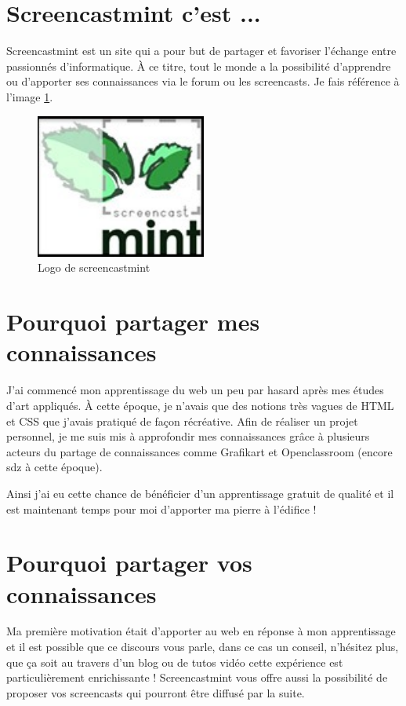 \documentclass[a4paper,11pt]{article}
\begin{document}
\listoffigures


\section{Screencastmint c'est ...}
Screencastmint est un site qui a pour but de partager et favoriser l'échange entre passionnés d'informatique. À ce titre, tout le monde a la possibilité d'apprendre ou d'apporter ses connaissances via le forum ou les screencasts. Je fais référence à l'image \ref{image1}.

\begin{figure}[h]
  \begin{flushright}
    \includegraphics[width=0.5\textwidth]{./image1.jpg}
    \caption{Logo de screencastmint}
    \label{image1}
  \end{flushright}
\end{figure}

\section{Pourquoi partager mes connaissances}
J'ai commencé mon apprentissage du web un peu par hasard après mes études d'art appliqués. À cette époque, je n'avais que des notions très vagues de HTML et CSS que j'avais pratiqué de façon récréative. Afin de réaliser un projet personnel, je me suis mis à approfondir mes connaissances grâce à plusieurs acteurs du partage de connaissances comme Grafikart et Openclassroom (encore sdz à cette époque).

Ainsi j'ai eu cette chance de bénéficier d'un apprentissage gratuit de qualité et il est maintenant temps pour moi d'apporter ma pierre à l'édifice !



\section{Pourquoi partager vos connaissances}
Ma première motivation était d'apporter au web en réponse à mon apprentissage et il est possible que ce discours vous parle, dans ce cas un conseil, n'hésitez plus, que ça soit au travers d'un blog ou de tutos vidéo cette expérience est particulièrement enrichissante ! Screencastmint vous offre aussi la possibilité de proposer vos screencasts qui pourront être diffusé par la suite.
\end{document}
